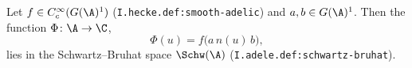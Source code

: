 Let $f\in C_c^\infty(G(\A)^1)$ (\texttt{I.hecke.def:smooth-adelic}) and $a,b\in G(\A)^1$. Then the function $\Phi\colon\A\to\C$,
\[
  \Phi(u)=f\bigl(a\,n(u)\,b\bigr),
\]
lies in the Schwartz--Bruhat space $\Schw(\A)$ (\texttt{I.adele.def:schwartz-bruhat}).
